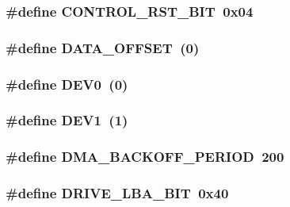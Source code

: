 \hypertarget{ide__disk_8hh_a8156819b43430caea117fda9179f6b92}{
\subsubsection[{CONTROL\_\-RST\_\-BIT}]{\setlength{\rightskip}{0pt plus 5cm}\#define CONTROL\_\-RST\_\-BIT~0x04}}
\label{ide__disk_8hh_a8156819b43430caea117fda9179f6b92}
\hypertarget{ide__disk_8hh_a11faa4c105a137b8edaa096de5063835}{
\subsubsection[{DATA\_\-OFFSET}]{\setlength{\rightskip}{0pt plus 5cm}\#define DATA\_\-OFFSET~(0)}}
\label{ide__disk_8hh_a11faa4c105a137b8edaa096de5063835}
\hypertarget{ide__disk_8hh_a23bd1221f53dd9ccc84c6afd59bde187}{
\subsubsection[{DEV0}]{\setlength{\rightskip}{0pt plus 5cm}\#define DEV0~(0)}}
\label{ide__disk_8hh_a23bd1221f53dd9ccc84c6afd59bde187}
\hypertarget{ide__disk_8hh_a5bb415eb7788e538901aa11bbe583094}{
\subsubsection[{DEV1}]{\setlength{\rightskip}{0pt plus 5cm}\#define DEV1~(1)}}
\label{ide__disk_8hh_a5bb415eb7788e538901aa11bbe583094}
\hypertarget{ide__disk_8hh_a64bcea63cca60e512b1094c19fc4c587}{
\subsubsection[{DMA\_\-BACKOFF\_\-PERIOD}]{\setlength{\rightskip}{0pt plus 5cm}\#define DMA\_\-BACKOFF\_\-PERIOD~200}}
\label{ide__disk_8hh_a64bcea63cca60e512b1094c19fc4c587}
\hypertarget{ide__disk_8hh_ad88dd68f3f134fbb039bc89e99db0e64}{
\subsubsection[{DRIVE\_\-LBA\_\-BIT}]{\setlength{\rightskip}{0pt plus 5cm}\#define DRIVE\_\-LBA\_\-BIT~0x40}}
